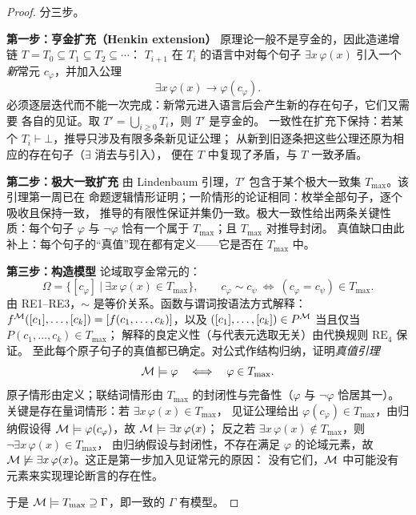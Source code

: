 \begin{proof}
分三步。

\par\smallskip\noindent\textbf{第一步：亨金扩充（Henkin extension）}\quad
原理论一般不是亨金的，因此造递增链 $T=T_0\subseteq T_1\subseteq T_2\subseteq\cdots$：
$T_{i+1}$ 在 $T_i$ 的语言中对每个句子 $\exists x\,\varphi(x)$ 引入一个\emph{新}常元
$c_\varphi$，并加入公理
\[
  \exists x\,\varphi(x)\longrightarrow\varphi(c_\varphi).
\]
必须逐层迭代而不能一次完成：新常元进入语言后会产生新的存在句子，它们又需要
各自的见证。取 $T'=\bigcup_{i\ge0}T_i$，则 $T'$ 是亨金的。
一致性在扩充下保持：若某个 $T_i\vdash\bot$，推导只涉及有限多条新见证公理；
从新到旧逐条把这些公理还原为相应的存在句子（$\exists$ 消去与引入），
便在 $T$ 中复现了矛盾，与 $T$ 一致矛盾。

\par\smallskip\noindent\textbf{第二步：极大一致扩充}\quad
由 Lindenbaum 引理，$T'$ 包含于某个极大一致集 $T_{\max}$。该引理第一周已在
命题逻辑情形证明；一阶情形的论证相同：枚举全部句子，逐个吸收且保持一致，
推导的有限性保证并集仍一致。极大一致性给出两条关键性质：每个句子 $\varphi$
与 $\neg\varphi$ 恰有一个属于 $T_{\max}$；且 $T_{\max}$ 对推导封闭。
真值缺口由此补上：每个句子的“真值”现在都有定义——它是否在 $T_{\max}$ 中。

\par\smallskip\noindent\textbf{第三步：构造模型}\quad
论域取亨金常元的：
\[
  \Omega=\bigl\{[c_\varphi]\ \big|\ \exists x\,\varphi(x)\in T_{\max}\bigr\},
  \qquad
  c_\varphi\sim c_\psi \ \Longleftrightarrow\ (c_\varphi=c_\psi)\in T_{\max}.
\]
由 RE1--RE3，$\sim$ 是等价关系。函数与谓词按语法方式解释：
$f^{\mathcal{M}}([c_1],\ldots,[c_k])=[f(c_1,\ldots,c_k)]$，以及
$([c_1],\ldots,[c_k])\in P^{\mathcal{M}}$ 当且仅当 $P(c_1,\ldots,c_k)\in T_{\max}$；
解释的良定义性（与代表元选取无关）由代换规则 $\mathrm{RE}_4$ 保证。
至此每个原子句子的真值都已确定。对公式作结构归纳，证明\emph{真值引理}
\[
  \mathcal{M}\models\varphi \quad\Longleftrightarrow\quad \varphi\in T_{\max}.
\]
原子情形由定义；联结词情形由 $T_{\max}$ 的封闭性与完备性（$\varphi$ 与
$\neg\varphi$ 恰居其一）。关键是存在量词情形：若 $\exists x\,\varphi(x)\in T_{\max}$，
见证公理给出 $\varphi(c_\varphi)\in T_{\max}$，由归纳假设得
$\mathcal{M}\models\varphi(c_\varphi)$，故 $\mathcal{M}\models\exists x\,\varphi(x)$；
反之若 $\exists x\,\varphi(x)\notin T_{\max}$，则 $\neg\exists x\,\varphi(x)\in T_{\max}$，
由归纳假设与封闭性，不存在满足 $\varphi$ 的论域元素，故
$\mathcal{M}\not\models\exists x\,\varphi(x)$。这正是第一步加入见证常元的原因：
没有它们，$\mathcal{M}$ 中可能没有元素来实现理论断言的存在性。

于是 $\mathcal{M}\models T_{\max}\supseteq\Gamma$，即一致的 $\Gamma$ 有模型。
\end{proof}

